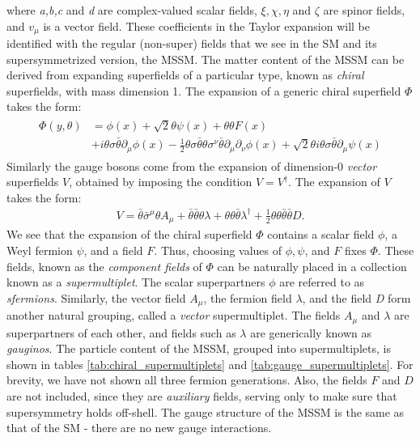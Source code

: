 where \emph{a,b,c} and \emph{d} are complex-valued scalar fields, $\xi,\chi,\eta$ and $\zeta$ are spinor fields, and $v_\mu$ is a vector field. These coefficients in the Taylor expansion will be identified with the regular (non-super) fields that we see in the SM and its supersymmetrized version, the MSSM. The matter content of the MSSM can be derived from expanding superfields of a particular type, known as \emph{chiral} superfields, with mass dimension 1. The expansion of a generic chiral superfield $\Phi$ takes the form:
\begin{align}
  \begin{split}
  \Phi(y,\theta) &= \phi(x) + \sqrt{2}\theta\psi(x)+\theta\theta F(x)\\
  &+i\theta\sigma\bar{\theta}\partial_\mu\phi(x)-\frac{1}{2}\theta\sigma\bar{\theta}\theta\sigma^\nu\bar{\theta}\partial_\mu\partial_\nu\phi(x) + \sqrt{2}\theta i\theta\sigma\bar{\theta}\partial_\mu\psi(x)
\end{split}
  \label{eq:chiral_superfield_expansion}
\end{align}
Similarly the gauge bosons come from the expansion of dimension-0 \emph{vector} superfields $V$, obtained by imposing the condition $V = V^\dagger$. 
The expansion of $V$ takes the form:
\begin{align}
V = \bar{\theta}\bar{\sigma}^\mu\theta A_\mu+\bar{\theta}\bar{\theta}\theta\lambda+\theta\theta\bar{\theta}\lambda^\dagger+\frac{1}{2}\theta\theta\bar{\theta}\bar{\theta}D.
\label{eq:vector_superfield_expansion}
\end{align}
We see that the expansion of the chiral superfield $\Phi$ contains a scalar field $\phi$, a Weyl fermion $\psi$, and a field $F$. Thus, choosing values of $\phi,\psi$, and $F$ fixes $\Phi$. These fields, known as the \emph{component fields} of $\Phi$ can be naturally placed in a collection known as a \emph{supermultiplet}. The scalar superpartners $\phi$ are referred to as \emph{sfermions}. 
Similarly, the vector field $A_\mu$, the fermion field $\lambda$, and the field \emph{D} form another natural grouping, called a \emph{vector} supermultiplet. The fields $A_\mu$ and $\lambda$ are superpartners of each other, and fields such as $\lambda$ are generically known as \emph{gauginos}. The particle content of the MSSM, grouped into supermultiplets, is shown in tables \ref{tab:chiral_supermultiplets} and \ref{tab:gauge_supermultiplets}. For brevity, we have not shown all three fermion generations. Also, the fields $F$ and $D$ are not included, since they are \emph{auxiliary} fields, serving only to make sure that supersymmetry holds off-shell. The gauge structure of the MSSM is the same as that of the SM - there are no new gauge interactions.

